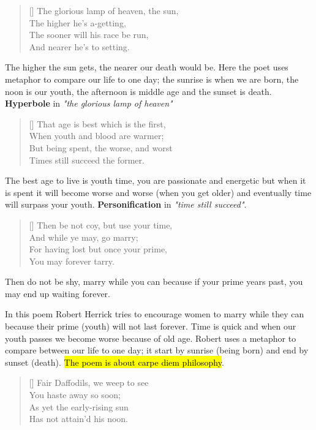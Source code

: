 \begin{verse}[\versewidth]
{\fontverse
The glorious lamp of heaven, the sun,\\
The higher he’s a-getting,\\
The sooner will his race be run,\\
And nearer he’s to setting.
} 
\end{verse}

The higher the sun gets, the nearer our death would be. Here the poet 
uses metaphor to compare our life to one day; the sunrise 
is when we are born, the noon is our youth, the afternoon is middle age and
the sunset is death. \textbf{Hyperbole} in \textit{"the glorious lamp of heaven"}

\begin{verse}[\versewidth]
{\fontverse
That age is best which is the first,\\
When youth and blood are warmer;\\
But being spent, the worse, and worst\\
Times still succeed the former. 
} 
\end{verse}

The best age to live is youth time, you are passionate and energetic
but when it is spent it will become worse and worse (when you get older)
and eventually time will surpass your youth. \textbf{Personification} in \textit{"time still succeed"}.

\begin{verse}[\versewidth]
{\fontverse
Then be not coy, but use your time,\\
And while ye may, go marry;\\
For having lost but once your prime,\\
You may forever tarry.
} 
\end{verse}

Then do not be shy, marry while you can because if
your prime years past, you may end up waiting forever.



In this poem Robert Herrick tries to encourage women to marry while they can
because their prime (youth) will not last forever.
Time is quick and when our youth passes we become worse because of old age. 
Robert uses a metaphor to compare between our life to one day;
it start by sunrise (being born) and end by sunset (death).
\hl{The poem is about carpe diem philosophy}.

\settowidth{\versewidth}{Fair Daffodils, we weep to see}
\begin{verse}[\versewidth]
{\fontverse
Fair Daffodils, we weep to see\\
You haste away so soon;\\
As yet the early-rising sun\\
Has not attain'd his noon.
} 
\end{verse}

